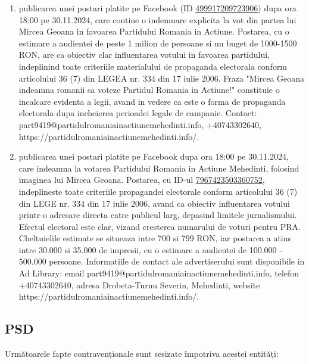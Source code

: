 \documentclass[a4paper,12pt]{article}
\begin{document}
\begin{enumerate}[leftmargin=*, label=\arabic*.)]
    \item publicarea unei postari platite pe Facebook (ID \href{https://www.facebook.com/ads/library/?id=499917209723906}{499917209723906}) dupa ora 18:00 pe 30.11.2024, care contine o indemnare explicita la vot din partea lui Mircea Geoana in favoarea Partidului Romania in Actiune.  Postarea, cu o estimare a audientei de peste 1 milion de persoane si un buget de 1000-1500 RON, are ca obiectiv clar influentarea votului in favoarea partidului, indeplinind toate criteriile materialului de propaganda electorala conform articolului 36 (7) din LEGEA nr. 334 din 17 iulie 2006.  Fraza "Mircea Geoana indeamna romanii sa voteze Partidul Romania in Actiune!" constituie o incalcare evidenta a legii, avand in vedere ca este o forma de propaganda electorala dupa incheierea perioadei legale de campanie.  Contact: part9419@partidulromaniainactiunemehedinti.info, +40743302640, https://partidulromaniainactiunemehedinti.info/.
    \item publicarea unei postari platite pe Facebook dupa ora 18:00 pe 30.11.2024, care indeamna la votarea Partidului Romania in Actiune Mehedinti, folosind imaginea lui Mircea Geoana. Postarea, cu ID-ul \href{https://www.facebook.com/ads/library/?id=7967423503360752}{7967423503360752},  indeplineste toate criteriile propagandei electorale conform articolului 36 (7) din LEGE nr. 334 din 17 iulie 2006, avand ca obiectiv influentarea votului printr-o adresare directa catre publicul larg, depasind limitele jurnalismului.  Efectul electoral este clar, vizand cresterea numarului de voturi pentru PRA.  Cheltuielile estimate se situeaza intre 700 si 799 RON, iar postarea a atins intre 30.000 si 35.000 de impresii, cu o estimare a audientei de 100.000 - 500.000 persoane.  Informatiile de contact ale advertiserului sunt disponibile in Ad Library: email part9419@partidulromaniainactiunemehedinti.info, telefon +40743302640, adresa Drobeta-Turnu Severin, Mehedinti, website https://partidulromaniainactiunemehedinti.info/.
\end{enumerate}

\vspace{0.5cm}

\subsection{PSD}
Următoarele fapte contravenționale sunt sesizate împotriva acestei entități:
\end{document}
